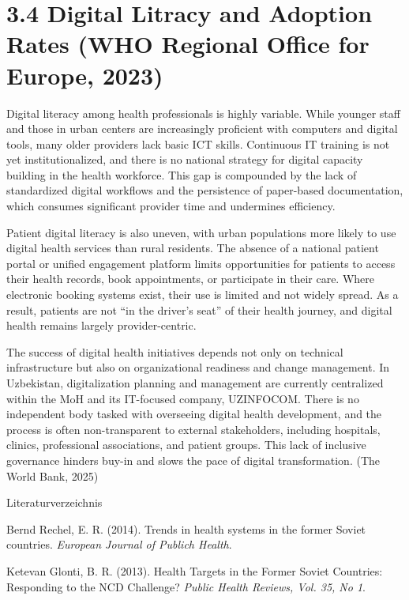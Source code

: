 \section{\texorpdfstring{\textbf{3.4 Digital Litracy and Adoption Rates}
(WHO Regional Office for Europe,
2023)}{3.4 Digital Litracy and Adoption Rates (WHO Regional Office for Europe, 2023)}}\label{digital-litracy-and-adoption-rates-who-regional-office-for-europe-2023}

Digital literacy among health professionals is highly variable. While
younger staff and those in urban centers are increasingly proficient
with computers and digital tools, many older providers lack basic ICT
skills. Continuous IT training is not yet institutionalized, and there
is no national strategy for digital capacity building in the health
workforce. This gap is compounded by the lack of standardized digital
workflows and the persistence of paper-based documentation, which
consumes significant provider time and undermines efficiency.

Patient digital literacy is also uneven, with urban populations more
likely to use digital health services than rural residents. The absence
of a national patient portal or unified engagement platform limits
opportunities for patients to access their health records, book
appointments, or participate in their care. Where electronic booking
systems exist, their use is limited and not widely spread. As a result,
patients are not ``in the driver's seat'' of their health journey, and
digital health remains largely provider-centric.

The success of digital health initiatives depends not only on technical
infrastructure but also on organizational readiness and change
management. In Uzbekistan, digitalization planning and management are
currently centralized within the MoH and its IT-focused company,
UZINFOCOM. There is no independent body tasked with overseeing digital
health development, and the process is often non-transparent to external
stakeholders, including hospitals, clinics, professional associations,
and patient groups. This lack of inclusive governance hinders buy-in and
slows the pace of digital transformation. (The World Bank, 2025)

Literaturverzeichnis

Bernd Rechel, E. R. (2014). Trends in health systems in the former
Soviet countries. \emph{European Journal of Publich Health}.

Ketevan Glonti, B. R. (2013). Health Targets in the Former Soviet
Countries: Responding to the NCD Challenge? \emph{Public Health Reviews,
Vol. 35, No 1}.

